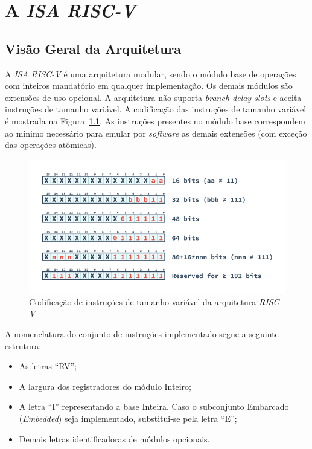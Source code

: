 \chapter{A \textit{ISA RISC-V}}\label{CapISA}


\section{Visão Geral da Arquitetura}
{
    A \textit{ISA RISC-V} é uma arquitetura modular, sendo o módulo base de
    operações com inteiros mandatório em qualquer implementação. Os demais
    módulos são extensões de uso opcional. A arquitetura não suporta
    \textit{branch delay slots} e aceita instruções de tamanho variável. A
    codificação das instruções de tamanho variável é mostrada na
    Figura~\ref{fig:riscv_var_length}. As instruções presentes no módulo
    base correspondem ao mínimo necessário para emular por
    \textit{software} as demais extensões (com exceção das operações
    atômicas).
}

\begin{figure}[H]
\centering
    \includegraphics[width=1\linewidth]{images/RV_InstructionLength.png}
    \caption{Codificação de instruções de tamanho variável da arquitetura
                \textit{RISC-V}}\label{fig:riscv_var_length}
\end{figure}

\clearpage

{
    A nomenclatura do conjunto de instruções implementado segue a
    seguinte estrutura:
}

\begin{itemize}[leftmargin=20mm]
    \item {As letras ``RV'';}
    \item {A largura dos registradores do módulo Inteiro;}
    \item {A letra ``I'' representando a base Inteira. Caso o subconjunto
            Embarcado (\textit{Embedded}) seja implementado, substitui-se
            pela letra ``E'';}
    \item {Demais letras identificadoras de módulos opcionais.}
\end{itemize}

